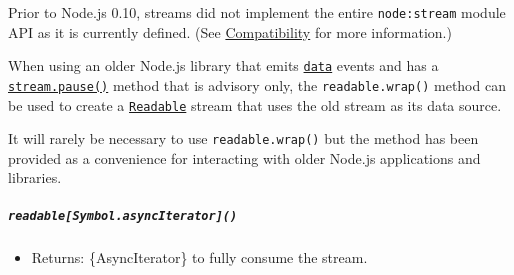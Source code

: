Prior to Node.js 0.10, streams did not implement the entire
\texttt{node:stream} module API as it is currently defined. (See
\hyperref[compatibility-with-older-nodejs-versions]{Compatibility} for
more information.)

When using an older Node.js library that emits
\hyperref[event-data]{\texttt{\textquotesingle{}data\textquotesingle{}}}
events and has a \hyperref[readablepause]{\texttt{stream.pause()}}
method that is advisory only, the \texttt{readable.wrap()} method can be
used to create a \hyperref[class-streamreadable]{\texttt{Readable}}
stream that uses the old stream as its data source.

It will rarely be necessary to use \texttt{readable.wrap()} but the
method has been provided as a convenience for interacting with older
Node.js applications and libraries.

\begin{Shaded}
\begin{Highlighting}[]
\OperatorTok{=} \NormalTok{(}\NormalTok{)}\OperatorTok{;}
\OperatorTok{=} \NormalTok{(}\NormalTok{)}\OperatorTok{;}
\OperatorTok{=}  \NormalTok{()}\OperatorTok{;}
\OperatorTok{=}  \NormalTok{()}\OperatorTok{;}

\NormalTok{(}\OperatorTok{,}\NormalTok{ () }\KeywordTok{=\textgreater{}}\NormalTok{ \{}
\NormalTok{()}\OperatorTok{;} 
\NormalTok{\})}\OperatorTok{;}
\end{Highlighting}
\end{Shaded}

\subparagraph{\texorpdfstring{\texttt{readable{[}Symbol.asyncIterator{]}()}}{readable{[}Symbol.asyncIterator{]}()}}\label{readablesymbol.asynciterator}

\begin{itemize}
\tightlist
\item
  Returns: \{AsyncIterator\} to fully consume the stream.
\end{itemize}

